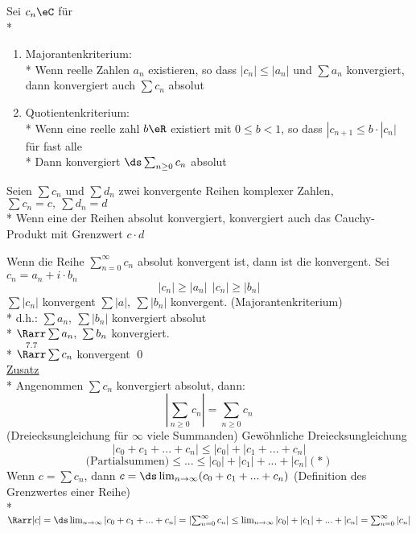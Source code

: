 Sei $c_n\eC$ für \nN\\*
\begin{enumerate}
\item{Majorantenkriterium:\\*
Wenn reelle Zahlen $a_n$ existieren, so dass $|c_n|\leq |a_n|$ und $\sum a_n$ konvergiert, dann konvergiert auch $\sum c_n$ absolut}
\item{Quotientenkriterium:\\*
Wenn eine reelle zahl $b\eR$ existiert mit $0\leq b<1$, so dass $|c_{n+1}\leq b·|c_n|$ für fast alle \nN\\*
Dann konvergiert $\ds\sum_{n\geq 0} c_n$ absolut}
\end{enumerate}

Seien $\sum c_n$ und $\sum d_n$ zwei konvergente Reihen komplexer Zahlen, $\sum c_n=c,\ \sum d_n=d$\\*
Wenn eine der Reihen absolut konvergiert, konvergiert auch das Cauchy-Produkt mit Grenzwert $c·d$

Wenn die Reihe $\sum_{n = 0}^{\infty} c_n$ absolut konvergent ist, dann ist die konvergent.
\bew
Sei $c_n = a_n + i \cdot b_n$ $$|c_n| \geq |a_n|\ \ |c_n| \geq |b_n|$$
$\sum |c_n|$ konvergent \Rarr $\sum |a|,\ \sum |b_n|$ konvergent. (Majorantenkriterium)\\*
d.h.: $\sum a_n,\ \sum |b_n|$ konvergiert absolut\\*
$\Rarr \sum a_n,\ \sum b_n$ konvergiert.\\*
$\overset{7.7}{\Rarr} \sum c_n$ konvergent \qed\\
\ul{Zusatz}\\*
Angenommen $\sum c_n$ konvergiert absolut, dann: 
$$\left| \sum_{n \geq 0} c_n \right| = \sum_{n \geq 0} c_n$$
(Dreiecksungleichung für $\infty$ viele Summanden)
\bew
Gewöhnliche Dreiecksungleichung \Rarr
$$|c_0 + c_1 + ... + c_n| \leq |c_0| + |c_1 + ... + c_n|$$
$$\text{(Partialsummen)} \leq ... \leq |c_0| + |c_1| + ... + |c_n| (*)$$
Wenn $c = \sum c_n$, dann $c = \ds\lim_{n \to \infty} (c_0 + c_1 + ... + c_n)$ (Definition des Grenzwertes einer Reihe)\\*
$\Rarr |c| = \ds\lim_{n \to \infty} |c_0 + c_1 + ... + c_n| = \left| \sum_{n = 0}^{\infty} c_n \right| \leq \lim_{n \to \infty} |c_0| + |c_1| + ... + |c_n| = \sum_{n = 0}^{\infty} |c_n|$